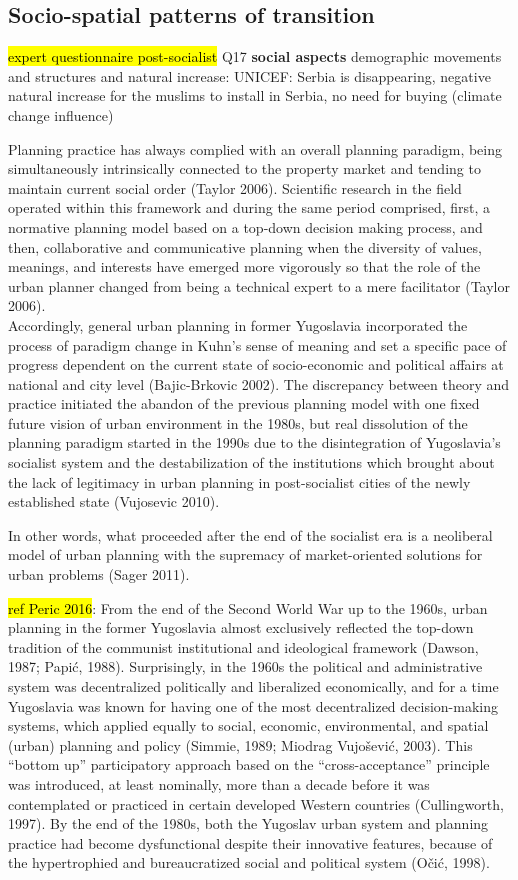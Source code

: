 \documentclass[11pt]{report}
\begin{document}
\subsection{Socio-spatial patterns of transition}

\hl{expert questionnaire post-socialist}
Q17
\textbf{social aspects}
demographic movements and structures
and natural increase:
UNICEF: Serbia is disappearing, negative natural increase
for the muslims to install in Serbia, no need for buying (climate change influence)

Planning practice has always complied with an overall planning paradigm, being simultaneously intrinsically connected to the property market and tending to maintain current social order (Taylor 2006). Scientific research in the field operated within this framework and during the same period comprised, first, a normative planning model based on a top-down decision making process, and then, collaborative and communicative planning when the diversity of values, meanings, and interests have emerged more vigorously so that the role of the urban planner changed from being a technical expert to a mere facilitator (Taylor 2006).
\\
Accordingly, general urban planning in former Yugoslavia incorporated the process of paradigm change in Kuhn’s sense of meaning and set a specific pace of progress dependent on the current state of socio-economic and political affairs at national and city level (Bajic-Brkovic 2002). The discrepancy between theory and practice initiated the abandon of the previous planning model with one fixed future vision of urban environment in the 1980s, but real dissolution of the planning paradigm started in the 1990s due to the disintegration of Yugoslavia’s socialist system and the destabilization of the institutions which brought about the lack of legitimacy in urban planning in post-socialist cities of the newly established state (Vujosevic 2010).

In other words, what proceeded after the end of the socialist era is a neoliberal model of urban planning with the supremacy of market-oriented solutions for urban problems (Sager 2011).

\hl{ref Peric 2016}: 
From the end of the Second World War up to the 1960s, urban planning in the former Yugoslavia almost exclusively reflected the top-down tradition of the communist institutional and ideological framework (Dawson, 1987; Papić, 1988). Surprisingly, in the 1960s the political and administrative system was decentralized politically and liberalized economically, and for a time Yugoslavia was known for having one of the most decentralized decision-making systems, which applied equally to social, economic, environmental, and spatial (urban) planning and policy (Simmie, 1989; Miodrag Vujošević, 2003). This “bottom up” participatory approach based on the “cross-acceptance” principle was introduced, at least nominally, more than a decade before it was contemplated or practiced in certain developed Western countries (Cullingworth, 1997). By the end of the 1980s, both the Yugoslav urban system and planning practice had become dysfunctional despite their innovative features, because of the hypertrophied and bureaucratized social and political system (Očić, 1998).
\end{document}
